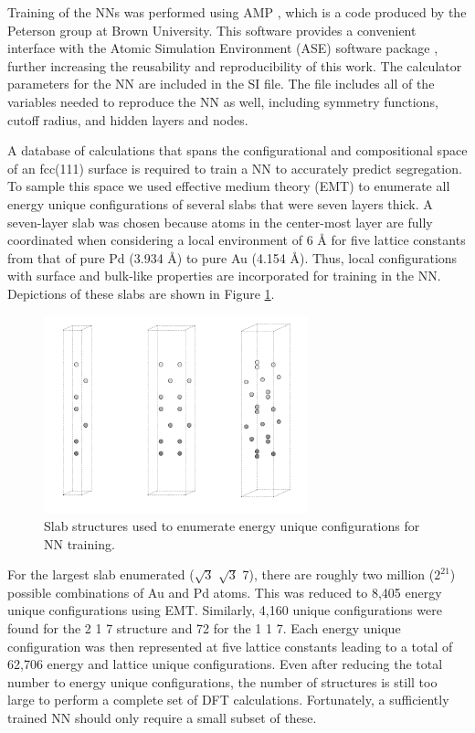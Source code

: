 \documentclass[12pt]{cmuthesis}
\begin{document}
Training of the NNs was performed using AMP \cite{khorshidi-2016-amp}, which is a code produced by the Peterson group at Brown University. This software provides a convenient interface with the Atomic Simulation Environment (ASE) software package \cite{bahn-2002-objec-orien}, further increasing the reusability and reproducibility of this work. The calculator parameters for the NN are included in the SI file. The file includes all of the variables needed to reproduce the NN as well, including symmetry functions, cutoff radius, and hidden layers and nodes.

A database of calculations that spans the configurational and compositional space of an fcc(111) surface is required to train a NN to accurately predict segregation. To sample this space we used effective medium theory (EMT) \cite{jacobsen-1996-semi-empir} to enumerate all energy unique configurations of several slabs that were seven layers thick. A seven-layer slab was chosen because atoms in the center-most layer are fully coordinated when considering a local environment of 6 \AA{} for five lattice constants from that of pure Pd (3.934 \AA{}) to pure Au (4.154 \AA{}). Thus, local configurations with surface and bulk-like properties are incorporated for training in the NN. Depictions of these slabs are shown in Figure \ref{fig-EMT-structures}.

\begin{figure}[h]
\centering
\includegraphics[width=3in]{./images/EMT-structures.png}
\caption{\label{fig-EMT-structures}
Slab structures used to enumerate energy unique configurations for NN training.}
\end{figure}

For the largest slab enumerated (\(\sqrt{3}\) \texttimes{} \(\sqrt{3}\) \texttimes{} 7), there are roughly two million (\(2^{21}\)) possible combinations of Au and Pd atoms. This was reduced to 8,405 energy unique configurations using EMT. Similarly, 4,160 unique configurations were found for the 2 \texttimes{} 1 \texttimes{} 7 structure and 72 for the 1 \texttimes{} 1 \texttimes{} 7. Each energy unique configuration was then represented at five lattice constants leading to a total of 62,706 energy and lattice unique configurations. Even after reducing the total number to energy unique configurations, the number of structures is still too large to perform a complete set of DFT calculations. Fortunately, a sufficiently trained NN should only require a small subset of these.
\end{document}
